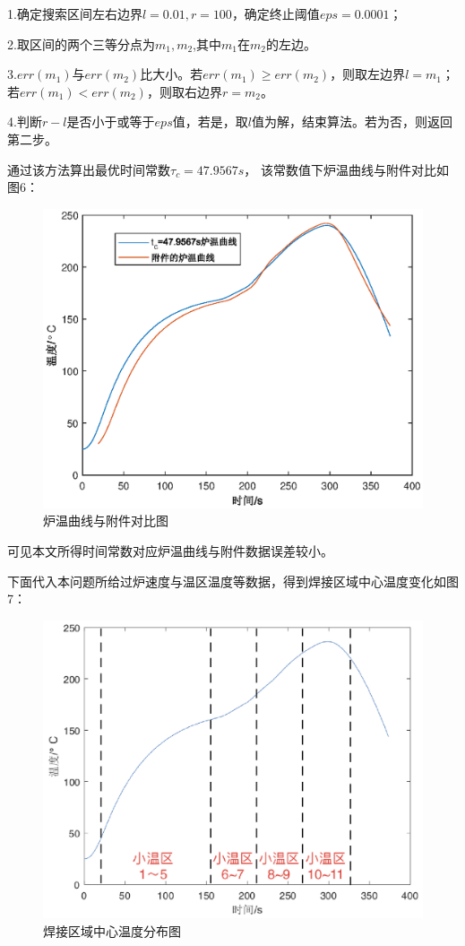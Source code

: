 \documentclass[a4paper,12pt]{ctexart} %
\begin{document}
	1.确定搜索区间左右边界$l=0.01,r=100$，确定终止阈值$eps=0.0001$；\par
	2.取区间的两个三等分点为$m_1,m_2$,其中$m_1$在$m_2$的左边。\par
	3.$err(m_1)$与$err(m_2)$比大小。若$err(m_1)\geqslant err(m_2)$，则取左边界$l=m_1$；若$err(m_1)<err(m_2)$，则取右边界$r=m_2$。\par
	4.判断$r-l$是否小于或等于$eps$值，若是，取$l$值为解，结束算法。若为否，则返回第二步。\par
	通过该方法算出最优时间常数$\tau_c=47.9567s$， 该常数值下炉温曲线与附件对比如图6：
	\begin{figure}[H]
		\centering
		\includegraphics[scale=0.65]{Q1-5}
		\caption{炉温曲线与附件对比图}
	\end{figure}\par
	可见本文所得时间常数对应炉温曲线与附件数据误差较小。\par
	下面代入本问题所给过炉速度与温区温度等数据，得到焊接区域中心温度变化如图7：
	\begin{figure}[H]
	\centering
	\includegraphics[scale=0.6]{Q1-6}
	\caption{焊接区域中心温度分布图}
	\end{figure}\par
	
\end{document}
